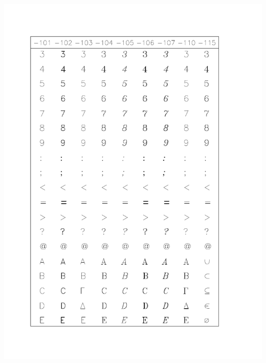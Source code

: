\documentclass[11pt,nolof]{starlink}
\begin{document}
\includegraphics[height=0.95\textheight]{sun83_c2}
\end{document}
